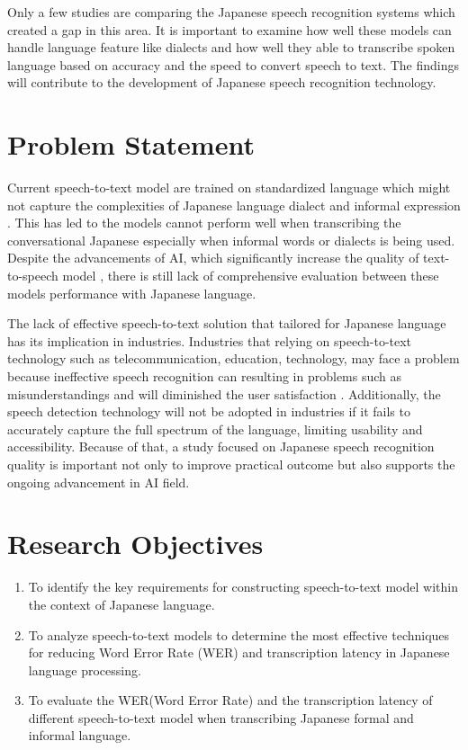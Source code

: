 Only a few studies are comparing the Japanese speech recognition systems which created a gap in this area. It is important to examine how well these models can handle language feature like dialects and how well they able to transcribe spoken language based on accuracy and the speed to convert speech to text. The findings will contribute to the development of Japanese speech recognition technology.


\section{Problem Statement}

Current speech-to-text model are trained on standardized language which might not capture the complexities of Japanese language dialect and informal expression \parencite{imaizumi2022}. This has led to the models cannot perform well when transcribing the conversational Japanese especially when informal words or dialects is being used. Despite the advancements of AI, which significantly increase the quality of text-to-speech model \parencite{Karita2021}, there is still lack of comprehensive evaluation between these models performance with Japanese language. 


The lack of effective speech-to-text solution that tailored for Japanese language has its implication in industries. Industries that relying on speech-to-text technology such as telecommunication, education, technology, may face a problem because ineffective speech recognition can resulting in problems such as misunderstandings and will diminished the user satisfaction \parencite{Sztahó2023}. Additionally, the speech detection technology will not be adopted in industries if it fails to accurately capture the full spectrum of the language, limiting usability and accessibility. Because of that, a study focused on Japanese speech recognition quality is important not only to improve practical outcome but also supports the ongoing advancement in AI field. 


\section{Research Objectives}
\begin{enumerate}
    \item To identify the key requirements for constructing speech-to-text
    model within the context of Japanese language.
    
    \item To analyze speech-to-text models to determine the most effective techniques for reducing Word Error Rate (WER) and transcription latency in Japanese language processing.

    \item To evaluate the WER(Word Error Rate) and the transcription latency of different speech-to-text model when transcribing Japanese formal and informal language.
\end{enumerate}

